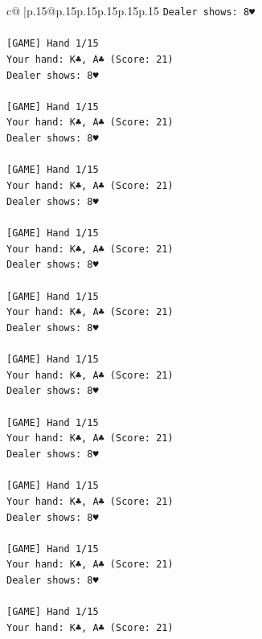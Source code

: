 \documentclass{article}
\begin{document}
{\begin{supertabular}{c@{$\;$}|p{.15\linewidth}@{}p{.15\linewidth}p{.15\linewidth}p{.15\linewidth}p{.15\linewidth}p{.15\linewidth}}
{{{\texttt{Dealer shows: 8♥} \\
\\ 
\texttt{{[}GAME{]} Hand 1/15} \\
\texttt{Your hand: K♣, A♣ (Score: 21)} \\
\texttt{Dealer shows: 8♥} \\
\\ 
\texttt{{[}GAME{]} Hand 1/15} \\
\texttt{Your hand: K♣, A♣ (Score: 21)} \\
\texttt{Dealer shows: 8♥} \\
\\ 
\texttt{{[}GAME{]} Hand 1/15} \\
\texttt{Your hand: K♣, A♣ (Score: 21)} \\
\texttt{Dealer shows: 8♥} \\
\\ 
\texttt{{[}GAME{]} Hand 1/15} \\
\texttt{Your hand: K♣, A♣ (Score: 21)} \\
\texttt{Dealer shows: 8♥} \\
\\ 
\texttt{{[}GAME{]} Hand 1/15} \\
\texttt{Your hand: K♣, A♣ (Score: 21)} \\
\texttt{Dealer shows: 8♥} \\
\\ 
\texttt{{[}GAME{]} Hand 1/15} \\
\texttt{Your hand: K♣, A♣ (Score: 21)} \\
\texttt{Dealer shows: 8♥} \\
\\ 
\texttt{{[}GAME{]} Hand 1/15} \\
\texttt{Your hand: K♣, A♣ (Score: 21)} \\
\texttt{Dealer shows: 8♥} \\
\\ 
\texttt{{[}GAME{]} Hand 1/15} \\
\texttt{Your hand: K♣, A♣ (Score: 21)} \\
\texttt{Dealer shows: 8♥} \\
\\ 
\texttt{{[}GAME{]} Hand 1/15} \\
\texttt{Your hand: K♣, A♣ (Score: 21)} \\
\texttt{Dealer shows: 8♥} \\
\\ 
\texttt{{[}GAME{]} Hand 1/15} \\
\texttt{Your hand: K♣, A♣ (Score: 21)} \\
}}}
\end{supertabular}}
\end{document}

